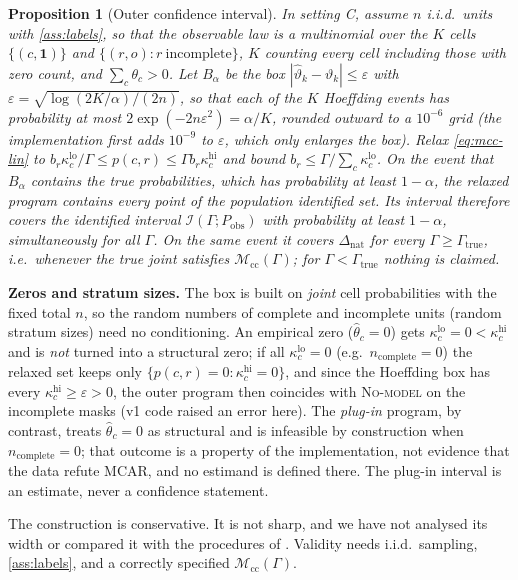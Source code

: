 \documentclass{article}
\theoremstyle{plain}
\newtheorem{proposition}[theorem]{Proposition}
\theoremstyle{definition}
\theoremstyle{remark}
\newcommand{\one}{\mathbf{1}}
\newcommand{\Dnat}{\Delta_{\mathrm{nat}}}
\newcommand{\Mcc}{\mathcal{M}_{\mathrm{cc}}}
\begin{document}
\begin{proposition}[Outer confidence interval]\label{prop:outer}
In setting C, assume $n$ i.i.d.\ units with \cref{ass:labels}, so that the
observable law is a multinomial over the $K$ cells $\{(c,\one)\}$ and
$\{(r,o):r\ \text{incomplete}\}$, $K$ counting every cell including those
with zero count, and $\sum_c\theta_c>0$. Let $B_\alpha$ be the box
$|\hat\vartheta_k-\vartheta_k|\le\varepsilon$ with
$\varepsilon=\sqrt{\log(2K/\alpha)/(2n)}$, so that each of the $K$ Hoeffding
events has probability at most $2\exp(-2n\varepsilon^2)=\alpha/K$, rounded
outward to a $10^{-6}$ grid (the implementation first adds $10^{-9}$ to
$\varepsilon$, which only enlarges the box). Relax \eqref{eq:mcc-lin} to
$b_r\kappa^{\mathrm{lo}}_c/\Gamma\le p(c,r)\le\Gamma b_r\kappa^{\mathrm{hi}}_c$
and bound $b_r\le\Gamma/\sum_c\kappa^{\mathrm{lo}}_c$. On the event that
$B_\alpha$ contains the true probabilities, which has probability at least
$1-\alpha$, the relaxed program contains every point of the population
identified set. Its interval therefore covers the identified interval
$\mathcal{I}(\Gamma;P_{\mathrm{obs}})$ with probability at least $1-\alpha$,
simultaneously for all $\Gamma$. On the same event it covers $\Dnat$ for every
$\Gamma\ge\Gamma_{\mathrm{true}}$, i.e.\ whenever the true joint satisfies
$\Mcc(\Gamma)$; for $\Gamma<\Gamma_{\mathrm{true}}$ nothing is claimed.
\end{proposition}

\textbf{Zeros and stratum sizes.} The box is built on \emph{joint} cell
probabilities with the fixed total $n$, so the random numbers of complete and
incomplete units (random stratum sizes) need no conditioning. An empirical
zero ($\hat\theta_c=0$) gets $\kappa^{\mathrm{lo}}_c=0<\kappa^{\mathrm{hi}}_c$ and is
\emph{not} turned into a structural zero; if all $\kappa^{\mathrm{lo}}_c=0$
(e.g.\ $n_{\mathrm{complete}}=0$) the relaxed set keeps only
$\{p(c,r)=0:\kappa^{\mathrm{hi}}_c=0\}$, and since the Hoeffding box has every
$\kappa^{\mathrm{hi}}_c\ge\varepsilon>0$, the outer program then coincides with
\textsc{No-model} on the incomplete masks (v1 code raised an error here). The
\emph{plug-in} program, by contrast, treats $\hat\theta_c=0$ as structural and
is infeasible by construction when $n_{\mathrm{complete}}=0$; that outcome is a
property of the implementation, not evidence that the data refute MCAR, and
no estimand is defined there. The plug-in interval is an estimate, never a
confidence statement.

The construction is conservative. It is not sharp, and we have not analysed
its width or compared it with the procedures of
\citet{imbens2004confidence,stoye2009more}. Validity needs i.i.d.\ sampling,
\cref{ass:labels}, and a correctly specified $\Mcc(\Gamma)$.
\end{document}
